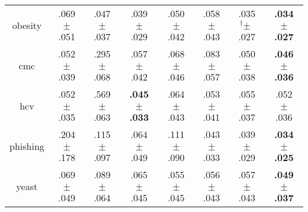 \begin{tabular}{|c|ccccccc|}
obesity & .069$^{\phantom{\dag}}\pm^{\phantom{\dag}}$.051\cellcolor{red!40} & .047$^{\phantom{\dag}}\pm^{\phantom{\dag}}$.037\cellcolor{green!10} & .039$^{\phantom{\dag}}\pm^{\phantom{\dag}}$.029\cellcolor{green!29} & .050$^{\phantom{\dag}}\pm^{\phantom{\dag}}$.042\cellcolor{green!3} & .058$^{\phantom{\dag}}\pm^{\phantom{\dag}}$.043\cellcolor{red!15} & .035$^{\dag}\pm^{\phantom{\dag}}$.027\cellcolor{green!36} & \textbf{.034$^{\phantom{\dag}}\pm^{\phantom{\dag}}$.027}\cellcolor{green!40} \\
cmc & .052$^{\phantom{\dag}}\pm^{\phantom{\dag}}$.039\cellcolor{green!37} & .295$^{\phantom{\dag}}\pm^{\phantom{\dag}}$.068\cellcolor{red!40} & .057$^{\phantom{\dag}}\pm^{\phantom{\dag}}$.042\cellcolor{green!36} & .068$^{\phantom{\dag}}\pm^{\phantom{\dag}}$.046\cellcolor{green!32} & .083$^{\phantom{\dag}}\pm^{\phantom{\dag}}$.057\cellcolor{green!28} & .050$^{\phantom{\dag}}\pm^{\phantom{\dag}}$.038\cellcolor{green!38} & \textbf{.046$^{\phantom{\dag}}\pm^{\phantom{\dag}}$.036}\cellcolor{green!40} \\
hcv & .052$^{\phantom{\dag}}\pm^{\phantom{\dag}}$.035\cellcolor{green!38} & .569$^{\phantom{\dag}}\pm^{\phantom{\dag}}$.063\cellcolor{red!40} & \textbf{.045$^{\phantom{\dag}}\pm^{\phantom{\dag}}$.033}\cellcolor{green!40} & .064$^{\phantom{\dag}}\pm^{\phantom{\dag}}$.043\cellcolor{green!37} & .053$^{\phantom{\dag}}\pm^{\phantom{\dag}}$.041\cellcolor{green!38} & .055$^{\phantom{\dag}}\pm^{\phantom{\dag}}$.037\cellcolor{green!38} & .052$^{\phantom{\dag}}\pm^{\phantom{\dag}}$.036\cellcolor{green!38} \\
phishing & .204$^{\phantom{\dag}}\pm^{\phantom{\dag}}$.178\cellcolor{red!40} & .115$^{\phantom{\dag}}\pm^{\phantom{\dag}}$.097\cellcolor{green!1} & .064$^{\phantom{\dag}}\pm^{\phantom{\dag}}$.049\cellcolor{green!26} & .111$^{\phantom{\dag}}\pm^{\phantom{\dag}}$.090\cellcolor{green!3} & .043$^{\phantom{\dag}}\pm^{\phantom{\dag}}$.033\cellcolor{green!35} & .039$^{\phantom{\dag}}\pm^{\phantom{\dag}}$.029\cellcolor{green!37} & \textbf{.034$^{\phantom{\dag}}\pm^{\phantom{\dag}}$.025}\cellcolor{green!40} \\
yeast & .069$^{\phantom{\dag}}\pm^{\phantom{\dag}}$.049\cellcolor{green!0} & .089$^{\phantom{\dag}}\pm^{\phantom{\dag}}$.064\cellcolor{red!40} & .065$^{\phantom{\dag}}\pm^{\phantom{\dag}}$.045\cellcolor{green!8} & .055$^{\phantom{\dag}}\pm^{\phantom{\dag}}$.045\cellcolor{green!27} & .056$^{\phantom{\dag}}\pm^{\phantom{\dag}}$.043\cellcolor{green!24} & .057$^{\phantom{\dag}}\pm^{\phantom{\dag}}$.043\cellcolor{green!24} & \textbf{.049$^{\phantom{\dag}}\pm^{\phantom{\dag}}$.037}\cellcolor{green!40} \\

\end{tabular}
